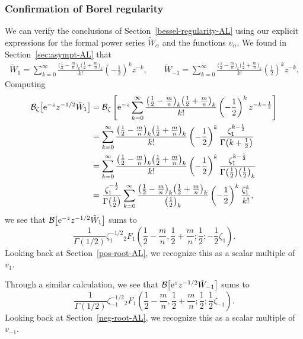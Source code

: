 \documentclass[10pt,a4paper]{amsart}
\newcommand{\borel}{\mathcal{B}}
\numberwithin{equation}{section}
\begin{document}
\subsubsection{Confirmation of Borel regularity}\label{confirmation-borel-regularity}
%
We can verify the conclusions of Section~\ref{bessel-regularity-AL} using our explicit expressions for the formal power series $\tilde{W}_\alpha$ and the functions $v_\alpha$. We found in Section~\ref{sec:asympt-AL} that
\begin{gather*}
\tilde{W}_1 = \sum_{k = 0}^{\infty} \frac{\bigl(\frac{1}{2}-\frac{m}{n}\bigr)_k \bigl(\frac{1}{2}+\frac{m}{n}\bigr)_k}{k!} \left(-\frac{1}{2}\right)^k z^{-k} ,\qquad
\tilde{W}_{-1} = \sum_{k = 0}^{\infty} \frac{\bigl(\frac{1}{2}-\frac{m}{n}\bigr)_k \bigl(\frac{1}{2}+\frac{m}{n}\bigr)_k}{k!} \left(\frac{1}{2}\right)^k z^{-k}.
\end{gather*}
Computing
\begin{align*}
\borel_\zeta \bigl[ {\rm e}^{-z} z^{-1/2} \tilde{W}_1 \bigr] & = \borel_\zeta \left[ {\rm e}^{-z} \sum_{k = 0}^{\infty} \frac{\bigl(\frac{1}{2}-\frac{m}{n}\bigr)_k \bigl(\frac{1}{2}+\frac{m}{n}\bigr)_k}{k!} \left(-\frac{1}{2}\right)^k z^{-k-\frac{1}{2}} \right] \\
& = \sum_{k = 0}^{\infty} \frac{\bigl(\frac{1}{2}-\frac{m}{n}\bigr)_k \bigl(\frac{1}{2}+\frac{m}{n}\bigr)_k}{k!} \left(-\frac{1}{2}\right)^k \frac{\zeta_1^{k-\frac{1}{2}}}{\Gamma\bigl(k+\frac{1}{2}\bigr)} \\
& = \sum_{k = 0}^{\infty} \frac{\bigl(\frac{1}{2}-\frac{m}{n}\bigr)_k \bigl(\frac{1}{2}+\frac{m}{n}\bigr)_k}{k!} \left(-\frac{1}{2}\right)^k \frac{\zeta_1^{k-\frac{1}{2}}}{\Gamma\bigl(\frac{1}{2}\bigr) \bigl(\frac{1}{2}\bigr)_k} \\
& = \frac{\zeta_1^{-\frac{1}{2}}}{\Gamma\bigl(\frac{1}{2}\bigr)} \sum_{k = 0}^{\infty} \frac{\bigl(\frac{1}{2}-\frac{m}{n}\bigr)_k \bigl(\frac{1}{2}+\frac{m}{n}\bigr)_k}{\bigl(\frac{1}{2}\bigr)_k} \left(-\frac{1}{2}\right)^k \frac{\zeta_1^k}{k!},
\end{align*}
we see that $\borel\bigl[ {\rm e}^{-z} z^{-1/2} \tilde{W}_1 \bigr]$ sums to
\[ \frac{1}{\Gamma(1/2)} \zeta_1^{-1/2} {}_2F_1\left(\frac{1}{2}-\frac{m}{n}, \frac{1}{2}+\frac{m}{n}; \frac{1}{2}; -\frac{1}{2}\zeta_1\right). \]
Looking back at Section~\ref{pos-root-AL}, we recognize this as a scalar multiple of $v_1$.

Through a similar calculation, we see that $\borel\bigl[{\rm e}^z z^{-1/2} \tilde{W}_{-1} \bigr]$ sums to
\[ \frac{1}{\Gamma(1/2)} \zeta_{-1}^{-1/2} {}_2F_1\left(\frac{1}{2}-\frac{m}{n}, \frac{1}{2}+\frac{m}{n}; \frac{1}{2}; \frac{1}{2}\zeta_{-1}\right). \]
Looking back at Section~\ref{neg-root-AL}, we recognize this as a scalar multiple of $v_{-1}$.
%
\end{document}
